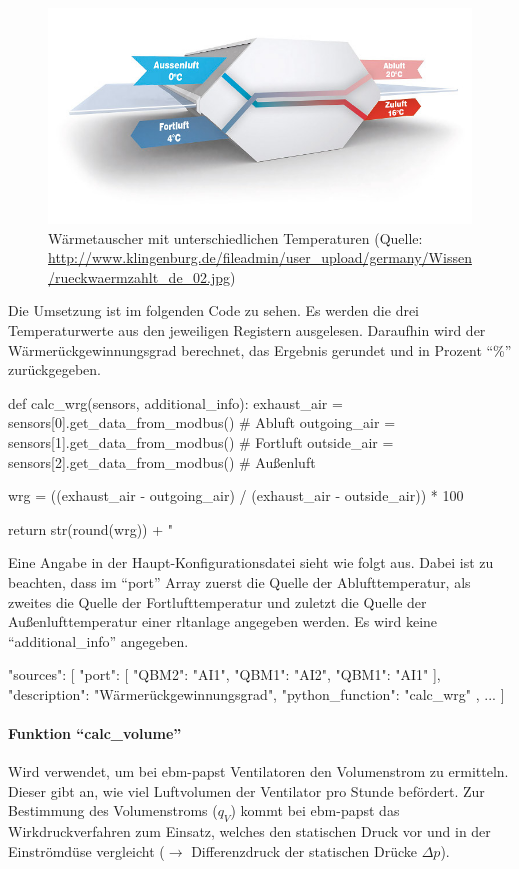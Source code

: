 \begin{figure}[H]
	\centering
	\includegraphics[width=0.7\linewidth]{Bilder/rueckwaermzahl_waermetauscher}
	\caption{Wärmetauscher mit unterschiedlichen Temperaturen (Quelle: \url{http://www.klingenburg.de/fileadmin/user_upload/germany/Wissen/rueckwaermzahlt_de_02.jpg})}
	\label{fig:waermetauscher_wrg}
\end{figure}
 
Die Umsetzung ist im folgenden Code zu sehen. Es werden die drei Temperaturwerte aus den jeweiligen Registern ausgelesen. Daraufhin wird der Wärmerückgewinnungsgrad berechnet, das Ergebnis gerundet und in Prozent \enquote{\%} zurückgegeben.

\begin{pythoncode}
def calc_wrg(sensors, additional_info):
	exhaust_air = sensors[0].get_data_from_modbus()  # Abluft
	outgoing_air = sensors[1].get_data_from_modbus()  # Fortluft
	outside_air = sensors[2].get_data_from_modbus()  # Außenluft
	
	wrg = ((exhaust_air - outgoing_air) / (exhaust_air - outside_air)) * 100
	
	return str(round(wrg)) + " %
\end{pythoncode}

Eine Angabe in der Haupt-Konfigurationsdatei sieht wie folgt aus. Dabei ist zu beachten, dass im \enquote{port} Array zuerst die Quelle der Ablufttemperatur, als zweites die Quelle der Fortlufttemperatur und zuletzt die Quelle der Außenlufttemperatur einer \acs{rltanlage} angegeben werden. Es wird keine \enquote{additional\_info} angegeben.

\begin{jsoncode}
	"sources": [
	{
		"port": [
			{"QBM2": "AI1"},
			{"QBM1": "AI2"},
			{"QBM1": "AI1"}
		],
		"description": "Wärmerückgewinnungsgrad",
		"python_function": "calc_wrg"
	},
	...
	]
\end{jsoncode}



\paragraph{Funktion \enquote{calc\_volume}}
Wird verwendet, um bei ebm-papst Ventilatoren den Volumenstrom zu ermitteln. Dieser gibt an, wie viel Luftvolumen der Ventilator pro Stunde befördert. Zur Bestimmung des Volumenstroms ($q_{V}$) kommt bei ebm-papst das Wirkdruckverfahren zum Einsatz, welches den statischen Druck vor und in der Einströmdüse vergleicht ($\rightarrow$ Differenzdruck der statischen Drücke $\Delta p$).

